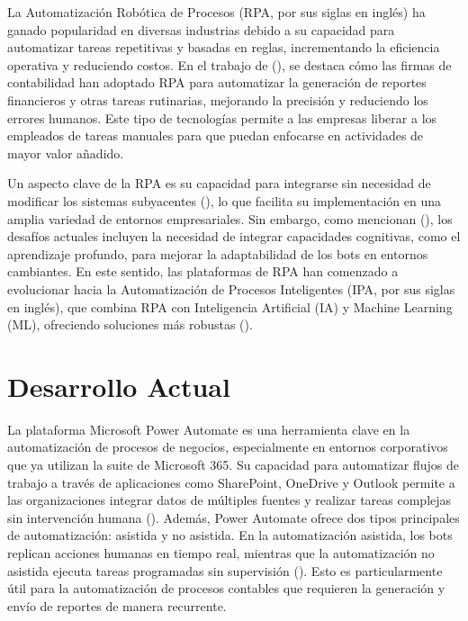 \documentclass[letter,oneside,12pt,spanish]{report}
\begin{document}
\noindent La Automatización Robótica de Procesos (RPA, por sus siglas en inglés) ha ganado popularidad en diversas industrias debido a su capacidad para automatizar tareas repetitivas y basadas en reglas, incrementando la eficiencia operativa y reduciendo costos. En el trabajo de (\cite{cooper2019rpa}), se destaca cómo las firmas de contabilidad han adoptado RPA para automatizar la generación de reportes financieros y otras tareas rutinarias, mejorando la precisión y reduciendo los errores humanos. Este tipo de tecnologías permite a las empresas liberar a los empleados de tareas manuales para que puedan enfocarse en actividades de mayor valor añadido.

\noindent Un aspecto clave de la RPA es su capacidad para integrarse sin necesidad de modificar los sistemas subyacentes (\cite{aalst2018bpm}), lo que facilita su implementación en una amplia variedad de entornos empresariales. Sin embargo, como mencionan (\cite{syed2020rpa}), los desafíos actuales incluyen la necesidad de integrar capacidades cognitivas, como el aprendizaje profundo, para mejorar la adaptabilidad de los bots en entornos cambiantes. En este sentido, las plataformas de RPA han comenzado a evolucionar hacia la Automatización de Procesos Inteligentes (IPA, por sus siglas en inglés), que combina RPA con Inteligencia Artificial (IA) y Machine Learning (ML), ofreciendo soluciones más robustas (\cite{gami2019ipa}).

\section{Desarrollo Actual}

\noindent La plataforma Microsoft Power Automate es una herramienta clave en la automatización de procesos de negocios, especialmente en entornos corporativos que ya utilizan la suite de Microsoft 365. Su capacidad para automatizar flujos de trabajo a través de aplicaciones como SharePoint, OneDrive y Outlook permite a las organizaciones integrar datos de múltiples fuentes y realizar tareas complejas sin intervención humana (\cite{microsoft2024powerautomate}). Además, Power Automate ofrece dos tipos principales de automatización: asistida y no asistida. En la automatización asistida, los bots replican acciones humanas en tiempo real, mientras que la automatización no asistida ejecuta tareas programadas sin supervisión (\cite{xerox2023powerautomate}). Esto es particularmente útil para la automatización de procesos contables que requieren la generación y envío de reportes de manera recurrente.
\end{document}
